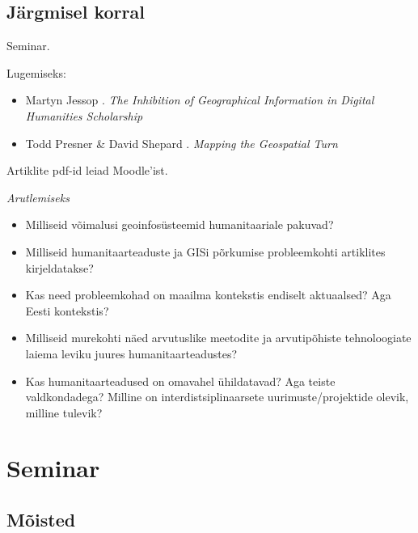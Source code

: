 \documentclass[
]{book}
\providecommand{\tightlist}{%
  \setlength{\itemsep}{0pt}\setlength{\parskip}{0pt}}
\begin{document}
\hypertarget{juxe4rgmisel-korral}{%
\section{Järgmisel korral}\label{juxe4rgmisel-korral}}

Seminar.

Lugemiseks:

\begin{itemize}
\tightlist
\item
  Martyn Jessop \citeyearpar{Jessop2008}. \emph{The Inhibition of Geographical Information in Digital Humanities Scholarship}
\item
  Todd Presner \& David Shepard \citeyearpar{Presner2015}. \emph{Mapping the Geospatial Turn}
\end{itemize}

Artiklite pdf-id leiad Moodle'ist.

\emph{Arutlemiseks}

\begin{itemize}
\tightlist
\item
  Milliseid võimalusi geoinfosüsteemid humanitaariale pakuvad?\\
\item
  Milliseid humanitaarteaduste ja GISi põrkumise probleemkohti artiklites kirjeldatakse?\\
\item
  Kas need probleemkohad on maailma kontekstis endiselt aktuaalsed? Aga Eesti kontekstis?\\
\item
  Milliseid murekohti näed arvutuslike meetodite ja arvutipõhiste tehnoloogiate laiema leviku juures humanitaarteadustes?\\
\item
  Kas humanitaarteadused on omavahel ühildatavad? Aga teiste valdkondadega? Milline on interdistsiplinaarsete uurimuste/projektide olevik, milline tulevik?
\end{itemize}

\hypertarget{seminar}{%
\chapter{Seminar}\label{seminar}}

\hypertarget{muxf5isted}{%
\section{Mõisted}\label{muxf5isted}}
\end{document}

